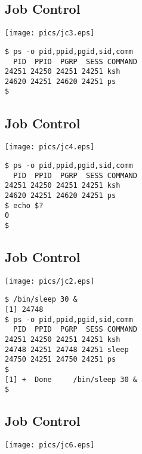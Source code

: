 \documentclass[xga]{xdvislides}
\begin{document}
\subsection{Job Control}
\begin{center}
	\texttt{[image: pics/jc3.eps]}
\end{center}
\addvspace{.5in}
\begin{verbatim}
$ ps -o pid,ppid,pgid,sid,comm
  PID  PPID  PGRP  SESS COMMAND
24251 24250 24251 24251 ksh
24620 24251 24620 24251 ps
$
\end{verbatim}

\subsection{Job Control}
\begin{center}
	\texttt{[image: pics/jc4.eps]}
\end{center}
\addvspace{.5in}
\begin{verbatim}
$ ps -o pid,ppid,pgid,sid,comm
  PID  PPID  PGRP  SESS COMMAND
24251 24250 24251 24251 ksh
24620 24251 24620 24251 ps
$ echo $?
0
$
\end{verbatim}

\subsection{Job Control}
\begin{center}
	\texttt{[image: pics/jc2.eps]}
\end{center}
\begin{verbatim}
$ /bin/sleep 30 &
[1]	24748
$ ps -o pid,ppid,pgid,sid,comm
  PID  PPID  PGRP  SESS COMMAND
24251 24250 24251 24251 ksh
24748 24251 24748 24251 sleep
24750 24251 24750 24251 ps
$
[1] +  Done     /bin/sleep 30 &
$
\end{verbatim}

\subsection{Job Control}
\begin{center}
	\texttt{[image: pics/jc6.eps]}
\end{center}
\end{document}
